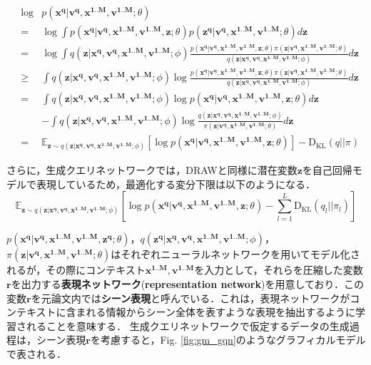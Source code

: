 \begin{eqnarray}
&\log& p(\bm{x^q} | \bm{v^q}, \bm{x^{1..M}}, \bm{v^{1..M}} ; \theta) \nonumber \\
&=& \log \int p(\bm{x^q} | \bm{v^q}, \bm{x^{1..M}}, \bm{v^{1..M}}, \bm{z}; \theta) p(\bm{z^q} | \bm{v^q}, \bm{x^{1..M}}, \bm{v^{1..M}}; \theta) d\bm{z} \nonumber \\
&=& \log \int q(\bm{z} | \bm{x^q}, \bm{v^q}, \bm{x^{1..M}}, \bm{v^{1..M}} ; \phi )
	\frac{p(\bm{x^q} | \bm{v^q}, \bm{x^{1..M}}, \bm{v^{1..M}}, \bm{z}; \theta) \pi(\bm{z} | \bm{v^q}, \bm{x^{1..M}}, \bm{v^{1..M}}; \theta)}
{q(\bm{z} | \bm{x^q}, \bm{v^q}, \bm{x^{1..M}}, \bm{v^{1..M}} ; \phi )} d\bm{z} \nonumber \\
&\geq&  \int q(\bm{z} | \bm{x^q}, \bm{v^q}, \bm{x^{1..M}}, \bm{v^{1..M}} ; \phi )
	\log \frac{p(\bm{x^q} | \bm{v^q}, \bm{x^{1..M}}, \bm{v^{1..M}}, \bm{z}; \theta) \pi(\bm{z} | \bm{v^q}, \bm{x^{1..M}}, \bm{v^{1..M}}; \theta)}
{q(\bm{z} | \bm{x^q}, \bm{v^q}, \bm{x^{1..M}}, \bm{v^{1..M}} ; \phi )} d\bm{z} \nonumber \\
&=& \int q(\bm{z} | \bm{x^q}, \bm{v^q}, \bm{x^{1..M}}, \bm{v^{1..M}} ; \phi )
\log p(\bm{x^q} | \bm{v^q}, \bm{x^{1..M}}, \bm{v^{1..M}}, \bm{z}; \theta) d\bm{z} \nonumber \\
	&\quad& - \int q(\bm{z} | \bm{x^q}, \bm{v^q}, \bm{x^{1..M}}, \bm{v^{1..M}} ; \phi )
		\log \frac {q(\bm{z} | \bm{x^q}, \bm{v^q}, \bm{x^{1..M}}, \bm{v^{1..M}} ; \phi )}
	{\pi(\bm{z} | \bm{v^q}, \bm{x^{1..M}}, \bm{v^{1..M}}; \theta)} d\bm{z} \nonumber \\
&=& \mathbb{E}_{\bm{z} \sim q(\bm{z} | \bm{x^q}, \bm{v^q}, \bm{x^{1..M}}, \bm{v^{1..M}} ; \phi )}
	[\log p(\bm{x^q} | \bm{v^q}, \bm{x^{1..M}}, \bm{v^{1..M}}, \bm{z}; \theta) ]
	- \mathrm { D } _ { \mathrm { KL } }(q||\pi) \label{eq:gqn_elbo}
\end{eqnarray}

さらに，生成クエリネットワークでは，DRAWと同様に潜在変数$\bm{z}$を自己回帰モデルで表現しているため，最適化する変分下限は以下のようになる．
\begin{equation}
\mathbb{E}_{\bm{z} \sim q(\bm{z} | \bm{x^q}, \bm{v^q}, \bm{x^{1..M}}, \bm{v^{1..M}} ; \phi )}
[\log p(\bm{x^q} | \bm{v^q}, \bm{x^{1..M}}, \bm{v^{1..M}}, \bm{z}; \theta)
- \sum _ { l = 1 } ^ { L } {\mathrm { D } _ { \mathrm { KL } }}
	(q_l || \pi_l)] \label{eq:gqn_draw_elbo}
\end{equation}

$p(\bm{x^q} | \bm{v^q}, \bm{x^{1..M}}, \bm{v^{1..M}}, \bm{z^q}; \theta)$，$q(\bm{z^q} | \bm{x^q}, \bm{v^q}, \bm{x^{1..M}}, \bm{v^{1..M}} ; \phi )$，$\pi(\bm{z} | \bm{v^q}, \bm{x^{1..M}}, \bm{v^{1..M}}; \theta)$はそれぞれニューラルネットワークを用いてモデル化されるが，その際にコンテキスト$\bm{x^{1..M}}, \bm{v^{1..M}}$を入力として，それらを圧縮した変数$\bm{r}$を出力する{\bf 表現ネットワーク}({\bf representation network})を用意しており．この変数$\bm{r}$を元論文内では{\bf シーン表現}と呼んでいる．これは，表現ネットワークがコンテキストに含まれる情報からシーン全体を表すような表現を抽出するように学習されることを意味する．
生成クエリネットワークで仮定するデータの生成過程は，シーン表現$\bm{r}$を考慮すると，Fig. \ref{fig:gm_gqn}のようなグラフィカルモデルで表される．


